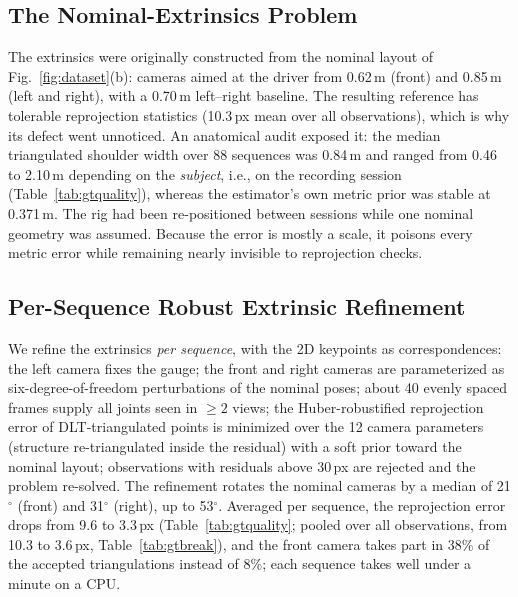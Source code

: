 \documentclass[journal]{IEEEtran}
\begin{document}
\subsection{The Nominal-Extrinsics Problem}
\label{sec:nominal}
The extrinsics were originally constructed from the nominal layout of Fig.~\ref{fig:dataset}(b): cameras aimed at the driver from 0.62\,m (front) and 0.85\,m (left and right), with a 0.70\,m left--right baseline. The resulting reference has tolerable reprojection statistics (10.3\,px mean over all observations), which is why its defect went unnoticed. An anatomical audit exposed it: the median triangulated shoulder width over 88 sequences was 0.84\,m and ranged from 0.46 to 2.10\,m depending on the \emph{subject}, i.e., on the recording session (Table~\ref{tab:gtquality}), whereas the estimator's own metric prior was stable at 0.371\,m. The rig had been re-positioned between sessions while one nominal geometry was assumed. Because the error is mostly a scale, it poisons every metric error while remaining nearly invisible to reprojection checks.

\subsection{Per-Sequence Robust Extrinsic Refinement}
\label{sec:persequence}
We refine the extrinsics \emph{per sequence}, with the 2D keypoints as correspondences: the left camera fixes the gauge; the front and right cameras are parameterized as six-degree-of-freedom perturbations of the nominal poses; about 40 evenly spaced frames supply all joints seen in $\geq2$ views; the Huber-robustified reprojection error of DLT-triangulated points is minimized over the 12 camera parameters (structure re-triangulated inside the residual) with a soft prior toward the nominal layout; observations with residuals above 30\,px are rejected and the problem re-solved. The refinement rotates the nominal cameras by a median of 21$^\circ$ (front) and 31$^\circ$ (right), up to 53$^\circ$. Averaged per sequence, the reprojection error drops from 9.6 to 3.3\,px (Table~\ref{tab:gtquality}; pooled over all observations, from 10.3 to 3.6\,px, Table~\ref{tab:gtbreak}), and the front camera takes part in 38\% of the accepted triangulations instead of 8\%; each sequence takes well under a minute on a CPU.
\end{document}
